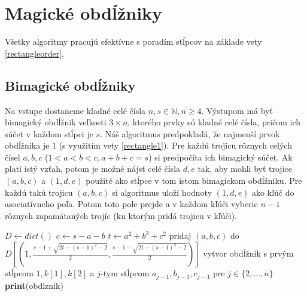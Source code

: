 \section{Magické obdĺžniky}

Všetky algoritmy pracujú efektívne s poradím stĺpcov na základe vety \ref{rectangleorder}.

\subsection{Bimagické obdĺžniky}

\begin{alg}
\label{algrectangle1}
Na vstupe dostaneme kladné celé čísla $n,s \in \mathbb{N}, n \geq 4$. Výstupom má byť bimagický obdĺžnik veľkosti $3 \times n$, ktorého prvky sú kladné celé čísla, pričom ich súčet v každom stĺpci je $s$. Náš algoritmus predpokladá, že najmenší prvok obdĺžnika je $1$ (s využitím vety \ref{rectangle1}). Pre každú trojicu rôznych celých čísel $a,b,c$ ($1 < a < b < c, a+b+c = s$) si predpočíta ich bimagický súčet. Ak platí istý vzťah, potom je možné nájsť celé čísla $d,e$ tak, aby mohli byť trojice $(a,b,c)$ a $(1,d,e)$ použité ako stĺpce v tom istom bimagickom obdĺžniku. Pre každú takú trojicu $(a,b,c)$ si algoritmus uloží hodnoty $(1,d,e)$ ako kľúč do asociatívneho poľa. Potom toto pole prejde a v každom kľúči vyberie $n-1$ rôznych zapamätaných trojíc (ku ktorým pridá trojicu v kľúči).
\end{alg}

\begin{algorithmic}
\STATE $D \gets dict()$
		\STATE $c \gets s-a-b$
		\STATE $t \gets a^2+b^2+c^2$
			\STATE pridaj $(a,b,c)$ do $D[(1, \frac{s-1 + \sqrt{2t - (s-1)^2 - 2}}{2}, \frac{s-1 - \sqrt{2t - (s-1)^2 - 2}}{2})]$
		\ENDIF
	\ENDFOR
\ENDFOR
{}
				\STATE vytvor obdĺžnik s prvým stĺpcom $1, k[1], k[2]$ a $j$-tym stĺpcom $a_{j-1}, b_{j-1}, c_{j-1}$ pre $j \in \{2, \dots , n\}$
					\STATE \textbf{print}(obdlznik)
				\ENDIF
			\ENDFOR
		\ENDIF
	\ENDFOR
\ENDFOR
\end{algorithmic}

